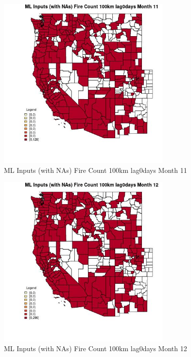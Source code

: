 \begin{figure} 
\centering  
\includegraphics[width=0.77\textwidth]{Code_Outputs/Report_ML_input_PM25_Step4_part_e_de_duplicated_aves_compiled_2019-05-21wNAs_CountyFire_Count_100km_lag0daysmedianMonth11.jpg} 
\caption{\label{fig:Report_ML_input_PM25_Step4_part_e_de_duplicated_aves_compiled_2019-05-21wNAsCountyFire_Count_100km_lag0daysmedianMonth11}ML Inputs (with NAs) Fire Count 100km lag0days Month 11} 
\end{figure} 
 

\begin{figure} 
\centering  
\includegraphics[width=0.77\textwidth]{Code_Outputs/Report_ML_input_PM25_Step4_part_e_de_duplicated_aves_compiled_2019-05-21wNAs_CountyFire_Count_100km_lag0daysmedianMonth12.jpg} 
\caption{\label{fig:Report_ML_input_PM25_Step4_part_e_de_duplicated_aves_compiled_2019-05-21wNAsCountyFire_Count_100km_lag0daysmedianMonth12}ML Inputs (with NAs) Fire Count 100km lag0days Month 12} 
\end{figure} 
 

